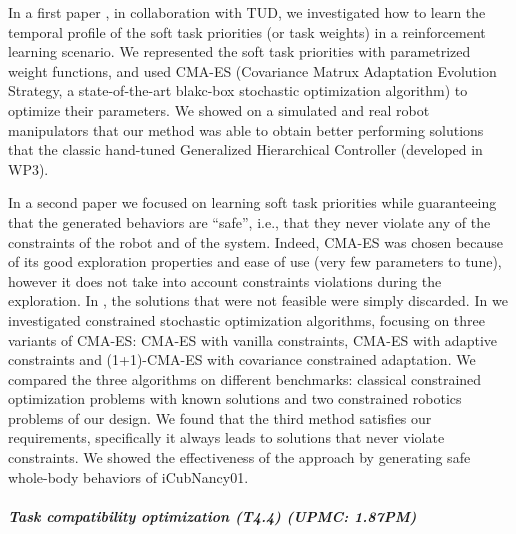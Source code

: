 In a first paper \cite{Modugno_PICRA_2016}, in collaboration with TUD, we investigated how to learn the temporal profile of the soft task priorities (or task weights) in a reinforcement learning scenario. We represented the soft task priorities with parametrized weight functions, and used CMA-ES (Covariance Matrux Adaptation Evolution Strategy, a state-of-the-art blakc-box stochastic optimization algorithm) to optimize their parameters. We showed on a simulated and real robot manipulators that our method was able to obtain better performing solutions that the classic hand-tuned Generalized Hierarchical Controller (developed in WP3).

In a second paper \cite{modugno2016learning} we focused on learning soft task priorities while guaranteeing that the generated behaviors are ``safe'', i.e., that they never violate any of the constraints of the robot and of the system. Indeed, CMA-ES was chosen because of its good exploration properties and ease of use (very few parameters to tune), however it does not take into account constraints violations during the exploration. In \cite{Modugno_PICRA_2016}, the solutions that were not feasible were simply discarded. In \cite{modugno2016learning} we investigated constrained stochastic optimization algorithms, focusing on three variants of CMA-ES: CMA-ES with vanilla constraints, CMA-ES with adaptive constraints and (1+1)-CMA-ES with covariance constrained adaptation. We compared the three algorithms on different benchmarks: classical constrained optimization problems with known solutions and two constrained robotics problems of our design. We found that the third method satisfies our requirements, specifically it always leads to solutions that never violate constraints. We showed the effectiveness of the approach by generating safe whole-body behaviors of iCubNancy01.

\subparagraph{Task compatibility optimization (T4.4) (UPMC: 1.87PM)}

